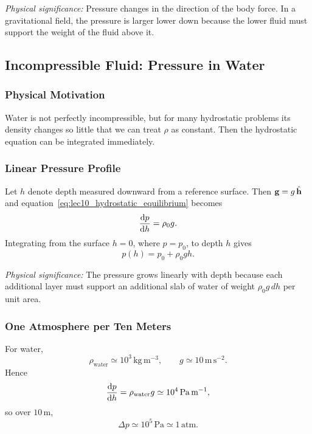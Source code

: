 \documentclass[../main.tex]{subfiles}
\begin{document}
\textit{Physical significance:} Pressure changes in the direction of the body force. In a gravitational field, the pressure is larger lower down because the lower fluid must support the weight of the fluid above it.

\subsection{Incompressible Fluid: Pressure in Water}\label{sec:lec10:incompressible-water}

\subsubsection*{Physical Motivation}
Water is not perfectly incompressible, but for many hydrostatic problems its density changes so little that we can treat $\rho$ as constant. Then the hydrostatic equation can be integrated immediately.

\subsubsection*{Linear Pressure Profile}
Let $h$ denote depth measured downward from a reference surface. Then $\mathbf{g}=g\,\hat{\mathbf{h}}$ and equation~\eqref{eq:lec10_hydrostatic_equilibrium} becomes
\begin{equation}
  \dv{p}{h}=\rho_0 g.
  \label{eq:lec10_dpdh_water}
\end{equation}
Integrating from the surface $h=0$, where $p=p_0$, to depth $h$ gives
\begin{equation}
  \boxed{p(h)=p_0+\rho_0 g h.}
  \label{eq:lec10_water_pressure_profile}
\end{equation}

\textit{Physical significance:} The pressure grows linearly with depth because each additional layer must support an additional slab of water of weight $\rho_0 g\,dh$ per unit area.

\subsubsection*{One Atmosphere per Ten Meters}
For water,
\begin{equation}
  \rho_{\mathrm{water}}\simeq 10^3\,\mathrm{kg\,m^{-3}},
  \qquad
  g\simeq 10\,\mathrm{m\,s^{-2}}.
  \label{eq:lec10_water_numbers}
\end{equation}
Hence
\begin{equation}
  \dv{p}{h}
  =
  \rho_{\mathrm{water}}g
  \simeq
  10^4\,\mathrm{Pa\,m^{-1}},
  \label{eq:lec10_water_pressure_gradient}
\end{equation}
so over $10\,\mathrm{m}$,
\begin{equation}
  \boxed{\Delta p\simeq 10^5\,\mathrm{Pa}\simeq 1\,\mathrm{atm}.}
  \label{eq:lec10_one_atm_per_ten_meters}
\end{equation}
\end{document}
